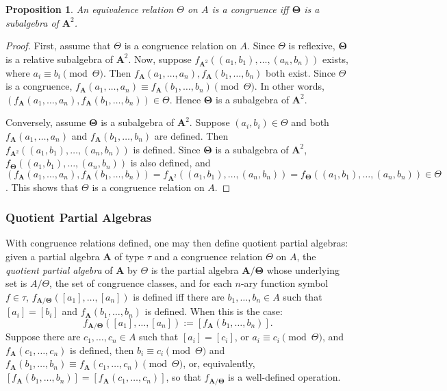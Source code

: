 \documentclass[12pt]{article}
\newtheorem{prop}{Proposition}
\begin{document}
\begin{prop} An equivalence relation $\Theta$ on $A$ is a congruence iff $\boldsymbol{\Theta}$ is a subalgebra of $\boldsymbol{A}^2$. \end{prop}
\begin{proof}  First, assume that $\Theta$ is a congruence relation on $A$.  Since $\Theta$ is reflexive, $\boldsymbol{\Theta}$ is a relative subalgebra of $\boldsymbol{A}^2$.  Now, suppose $f_{\boldsymbol{A}^2}((a_1,b_1),\ldots, (a_n,b_n))$ exists, where $a_i\equiv b_i \pmod{\Theta}$.  Then $f_{\boldsymbol{A}}(a_1,\ldots, a_n), f_{\boldsymbol{A}}(b_1,\ldots, b_n)$ both exist.  Since $\Theta$ is a congruence, $f_{\boldsymbol{A}}(a_1,\ldots, a_n) \equiv f_{\boldsymbol{A}}(b_1,\ldots, b_n) \pmod{\Theta}$.  In other words, $(f_{\boldsymbol{A}}(a_1,\ldots, a_n), f_{\boldsymbol{A}}(b_1,\ldots, b_n)) \in \Theta$.  Hence $\boldsymbol{\Theta}$ is a subalgebra of $\boldsymbol{A}^2$.

Conversely, assume $\boldsymbol{\Theta}$ is a subalgebra of $\boldsymbol{A}^2$.  Suppose $(a_i,b_i)\in \Theta$ and both $f_{\boldsymbol{A}}(a_1,\ldots, a_n)$ and $f_{\boldsymbol{A}}(b_1,\ldots, b_n)$ are defined.  Then $f_{\boldsymbol{A}^2}((a_1,b_1),\ldots, (a_n,b_n))$ is defined.  Since $\boldsymbol{\Theta}$ is a subalgebra of $\boldsymbol{A}^2$, $f_{\boldsymbol{\Theta}}((a_1,b_1),\ldots, (a_n,b_n))$ is also defined, and $(f_{\boldsymbol{A}}(a_1,\ldots, a_n), f_{\boldsymbol{A}}(b_1,\ldots, b_n))  = f_{\boldsymbol{A}^2}((a_1,b_1),\ldots, (a_n,b_n)) = f_{\boldsymbol{\Theta}}((a_1,b_1),\ldots, (a_n,b_n)) \in \Theta$.  This shows that $\Theta$ is a congruence relation on $A$.
\end{proof}

\subsubsection*{Quotient Partial Algebras}

With congruence relations defined, one may then define quotient partial algebras: given a partial algebra $\boldsymbol{A}$ of type $\tau$ and a congruence relation $\Theta$ on $A$, the \emph{quotient partial algebra} of $\boldsymbol{A}$ by $\Theta$ is the partial algebra $\boldsymbol{A/\Theta}$ whose underlying set is $A/\Theta$, the set of congruence classes, and for each $n$-ary function symbol $f\in \tau$, $f_{\boldsymbol{A/\Theta}}([a_1],\ldots, [a_n])$ is defined iff there are $b_1,\ldots, b_n \in A$ such that $[a_i]=[b_i]$ and $f_{\boldsymbol{A}}(b_1,\ldots, b_n)$ is defined.  When this is the case: $$f_{\boldsymbol{A/\Theta}}([a_1],\ldots, [a_n]):=[f_{\boldsymbol{A}}(b_1,\ldots, b_n)].$$
Suppose there are $c_1,\ldots, c_n\in A$ such that $[a_i]=[c_i]$, or $a_i\equiv c_i \pmod{\Theta}$, and $f_{\boldsymbol{A}}(c_1,\ldots, c_n)$ is defined, then $b_i\equiv c_i\pmod{\Theta}$ and $f_{\boldsymbol{A}}(b_1,\ldots, b_n) \equiv f_{\boldsymbol{A}}(c_1,\ldots, c_n) \pmod{\Theta}$, or, equivalently, $[f_{\boldsymbol{A}}(b_1,\ldots, b_n)]=[f_{\boldsymbol{A}}(c_1,\ldots, c_n)]$, so that $f_{\boldsymbol{A/\Theta}}$ is a well-defined operation.
\end{document}
